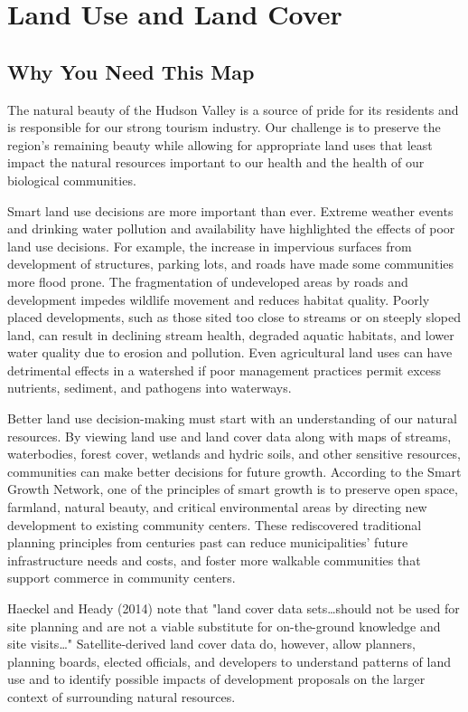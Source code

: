 \section{Land Use and Land Cover}\label{subsec:landuse}
\subsection*{Why You Need This Map}
The natural beauty of the Hudson Valley is a source of pride for its residents 
and is responsible for our strong tourism industry. Our challenge is to preserve 
the region’s remaining beauty while allowing for appropriate land uses that 
least impact the natural resources important to our health and the health of our 
biological communities.
\par
Smart land use decisions are more important than ever. Extreme weather events 
and drinking water pollution and availability have highlighted the effects of 
poor land use decisions. For example, the increase in impervious surfaces from 
development of structures, parking lots, and roads have made some communities 
more flood prone. The fragmentation of undeveloped areas by roads and 
development impedes wildlife movement and reduces habitat quality. Poorly 
placed developments, such as those sited too close to streams or on steeply 
sloped land, can result in declining stream health, degraded aquatic habitats, 
and lower water quality due to erosion and pollution. Even agricultural land 
uses can have detrimental effects in a watershed if poor management practices 
permit excess nutrients, sediment, and pathogens into waterways.
\par
Better land use decision-making must start with an understanding of our natural 
resources. By viewing land use and land cover data along with maps of streams, 
waterbodies, forest cover, wetlands and hydric soils, and other sensitive 
resources, communities can make better decisions for future growth. According to 
the Smart Growth Network, one of the principles of smart growth is to preserve 
open space, farmland, natural beauty, and critical environmental areas by 
directing new development to existing community centers. These rediscovered 
traditional planning principles from centuries past can reduce municipalities’ 
future infrastructure needs and costs, and foster more walkable communities that 
support commerce in community centers.
\par
Haeckel and Heady (2014) note that "land cover data sets\ldots should not be 
used for site planning and are not a viable substitute for on-the-ground 
knowledge and site visits\ldots" Satellite-derived land cover data do, however, 
allow planners, planning boards, elected officials, and developers to understand 
patterns of land use and to identify possible impacts of development proposals 
on the larger context of surrounding natural resources.

